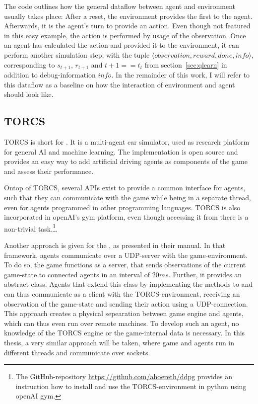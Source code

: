 The code outlines how the general dataflow between agent and environment usually takes place: After a reset, the environment provides the first  to the agent. Afterwards, it is the agent's turn to provide an action. Even though not featured in this easy example, the action is performed by usage of the observation. Once an agent has calculated the action and provided it to the environment, it can perform another simulation step, with the tuple $\langle observation, reward, done, info\rangle$, corresponding to $s_{t+1}$, $r_{t+1}$ and $t+1==t_t$ from section~\ref{sec:qlearn} in addition to debug-information $info$. In the remainder of this work, I will refer to this dataflow as a baseline on how the interaction of environment and agent should look like.

\subsection{TORCS}

TORCS is short for \cite{wymann_torcs_2013, wymann_torcs_2015}. It is a multi-agent car simulator, used as research platform for general AI and machine learning. The implementation is open source and provides an easy way to add artificial driving agents as components of the game and assess their performance. 

Ontop of TORCS, several APIs exist to provide a common interface for agents, such that they can communicate with the game while being in a separate thread, even for agents programmed in other programming languages. TORCS is also incorporated in openAI's gym platform, even though accessing it from there is a non-trivial task.\footnote{The GitHub-repository \url{https://github.com/ahoereth/ddpg} provides an instruction how to install and use the TORCS-environment in python using openAI gym.}. 

Another approach is given for the , as presented in their manual\cite{loiacono_simulated_2013}. In that framework, agents communicate over a UDP-server with the game-environment. To do so, the game functions as a server, that sends observations of the current game-state to connected agents in an interval of $20ms$. Further, it provides an abstract  class. Agents that extend this class by implementing the methods to  and  can thus communicate as a client with the TORCS-environment, receiving an observation of the game-state and sending their action using a UDP-connection. This approach creates a physical sepearation between game engine and agents, which can thus even run over remote machines. To develop such an agent, no knowledge of the TORCS engine or the game-internal data is necessary. In this thesis, a very similar approach will be taken, where game and agents run in different threads and communicate over sockets. 

